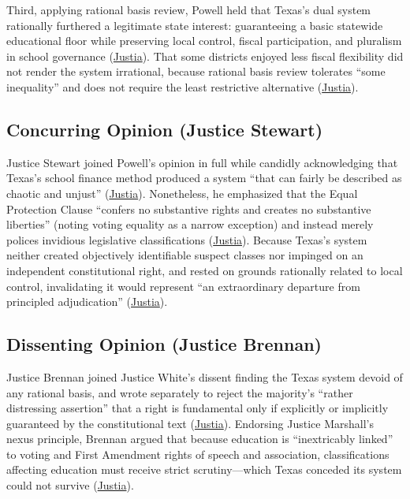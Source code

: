 \documentclass[12pt]{article}
\begin{document}
Third, applying rational basis review, Powell held that Texas's dual system rationally furthered a legitimate state interest: guaranteeing a basic statewide educational floor while preserving local control, fiscal participation, and pluralism in school governance (\href{https://supreme.justia.com/cases/federal/us/411/1/}{Justia}). That some districts enjoyed less fiscal flexibility did not render the system irrational, because rational basis review tolerates ``some inequality'' and does not require the least restrictive alternative (\href{https://supreme.justia.com/cases/federal/us/411/1/}{Justia}).

\subsection{Concurring Opinion (Justice Stewart)}

Justice Stewart joined Powell's opinion in full while candidly acknowledging that Texas's school finance method produced a system ``that can fairly be described as chaotic and unjust'' (\href{https://supreme.justia.com/cases/federal/us/411/1/}{Justia}). Nonetheless, he emphasized that the Equal Protection Clause ``confers no substantive rights and creates no substantive liberties'' (noting voting equality as a narrow exception) and instead merely polices invidious legislative classifications (\href{https://supreme.justia.com/cases/federal/us/411/1/}{Justia}). Because Texas's system neither created objectively identifiable suspect classes nor impinged on an independent constitutional right, and rested on grounds rationally related to local control, invalidating it would represent ``an extraordinary departure from principled adjudication'' (\href{https://supreme.justia.com/cases/federal/us/411/1/}{Justia}).

\subsection{Dissenting Opinion (Justice Brennan)}

Justice Brennan joined Justice White's dissent finding the Texas system devoid of any rational basis, and wrote separately to reject the majority's ``rather distressing assertion'' that a right is fundamental only if explicitly or implicitly guaranteed by the constitutional text (\href{https://supreme.justia.com/cases/federal/us/411/1/}{Justia}). Endorsing Justice Marshall's nexus principle, Brennan argued that because education is ``inextricably linked'' to voting and First Amendment rights of speech and association, classifications affecting education must receive strict scrutiny---which Texas conceded its system could not survive (\href{https://supreme.justia.com/cases/federal/us/411/1/}{Justia}).
\end{document}
